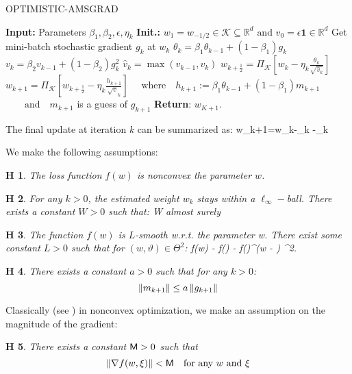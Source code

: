 \documentclass[11pt]{article}
\newtheorem{assumption}{H\!\!}
\theoremstyle{k}
\begin{document}
\begin{algorithm}[H]
\caption{OPTIMISTIC-AMSGRAD}\label{alg:opt-ams}
  \begin{algorithmic}[1]
  \STATE \textbf{Input:} Parameters $\beta_{1}, \beta_{2}, \epsilon, \eta_{k}$
  \STATE \textbf{Init.:} $w_{1}=w_{-1 / 2} \in \mathcal{K} \subseteq \mathbb{R}^{d} \text { and } v_{0}=\epsilon \mathbf{1} \in \mathbb{R}^{d}$
  \STATE Get mini-batch stochastic gradient $g_{k}$ at $w_{k}$
   \STATE $\theta_{k}=\beta_{1} \theta_{k-1}+\left(1-\beta_{1}\right) g_{k}$
   \STATE $v_{k}=\beta_{2} v_{k-1}+\left(1-\beta_{2}\right) g_{k}^{2}$
   \STATE $ \hat{v}_{k}=\max \left(\hat{v}_{k-1}, v_{k}\right)$
   \STATE $ w_{k+\frac{1}{2}}=\Pi_{\mathcal{K}}\left[w_k-\eta_{k} \frac{\theta_{k}}{\sqrt{\hat{v}_{k}}}\right]$
   \STATE $ w_{k+1}=\Pi_{\mathcal{K}}\left[w_{k+\frac{1}{2}}-\eta_{k} \frac{h_{k+1}}{\sqrt{v}_{k}}\right]$
   \STATE $ \quad \text{where} \quad h_{k+1}:=\beta_{1} \theta_{k-1} + (1-\beta_{1}) m_{k+1}$
      \STATE $ \quad\quad \text{and} \quad m_{k+1}$ is a guess of $g_{k+1}$
\ENDFOR
\STATE \textbf{Return}: $w_{K+1}$.
  \end{algorithmic}
\end{algorithm}\vspace{.1cm}
The final update at iteration $k$ can be summarized as:
\beq\label{eq:finalupdate}
w_{k+1}=w_{k}-\eta_{k} -\eta_{k} 
\eeq



We make the following assumptions:
\begin{assumption}\label{ass:nonconv}
The loss function $f(w)$ is nonconvex \wrt the parameter $w$.
\end{assumption}

\begin{assumption}\label{ass:boundedparam}
For any $k >0$, the estimated weight $w_k$ stays within a $\ell_{\infty}-$ball. There exists a constant $W >0$ such that:
\beq
{} \leq W \quad \textrm{almost surely}
\eeq
\end{assumption}

\begin{assumption}\label{ass:smooth}
The function $f(w)$ is $L$-smooth w.r.t. the parameter w.
There exist some constant $L > 0$ such that for $(w, \vartheta) \in \Theta^2$:
\beq
f(w) - f(\vartheta) - \nabla f(\vartheta)^\top(w - \vartheta) \leq {} ^2\eqsp.
\eeq
\end{assumption}
\begin{assumption}\label{ass:guessbound}
There exists a constant $a >0$ such that for any $k >0$:
$$
\left\Vert m_{k+1} \right\Vert \leq a \left\Vert g_{k+1} \right\Vert
$$
\end{assumption}
Classically (see \citep{ghadimi2013stochastic}) in nonconvex optimization, we make an assumption on the magnitude of the gradient:
\begin{assumption}\label{ass:bounded}
There exists a constant $\mathsf{M} >0$ such that 
$$
\left\Vert \nabla f(w, \xi) \right\Vert < \mathsf{M} \quad \textrm{for any $w$ and $\xi$}
$$
\end{assumption}
\end{document}
